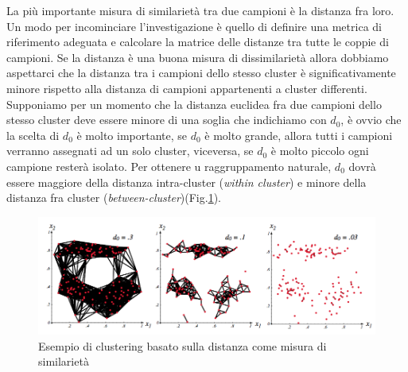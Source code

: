 \noindent La più importante misura di similarietà tra due campioni è la distanza fra loro. Un modo per incominciare l'investigazione è quello di definire una metrica di riferimento adeguata e calcolare la matrice delle distanze tra tutte le coppie di campioni. Se la distanza è una buona misura di dissimilarietà allora dobbiamo aspettarci che la distanza tra i campioni dello stesso cluster è significativamente minore rispetto alla distanza di campioni appartenenti a cluster differenti. Supponiamo per un momento che la distanza euclidea fra due campioni dello stesso cluster deve essere minore di una soglia che indichiamo con $d_0$, è ovvio che la scelta di $d_0$ è molto importante, se $d_0$ è molto grande, allora tutti i campioni verranno assegnati ad un solo cluster, viceversa, se $d_0$ è molto piccolo ogni campione resterà isolato. Per ottenere u raggruppamento naturale, $d_0$ dovrà essere maggiore della distanza intra-cluster (\emph{within cluster}) e minore della distanza fra cluster (\emph{between-cluster})(Fig.\ref{similarieta}).\\
 
\begin{figure}
\centering
\includegraphics[scale=0.45]{img/similarieta.png}
\caption{Esempio di clustering basato sulla distanza come misura di similarietà}
\label{similarieta}
\end{figure}

